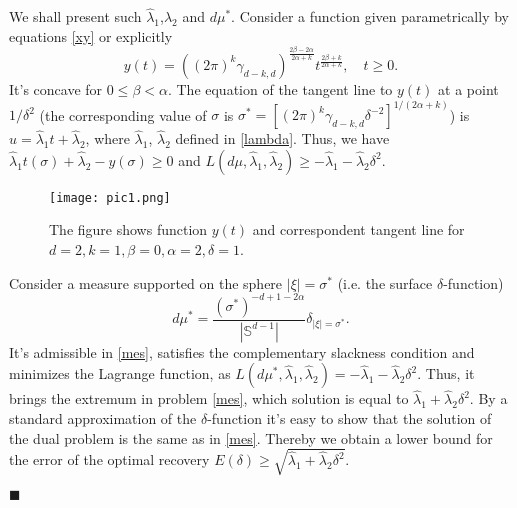 \documentclass[12pt]{iopart}
\newenvironment{proof}
{\par\noindent{\bf Proof}}
{\hfill$\scriptstyle\blacksquare$}
\begin{document}
\begin{proof}
We shall present such $\widehat\lambda_1$,$\widehat\lambda_2$ and $d\mu^*$.
Consider a function given parametrically by equations \eqref{xy} or explicitly
     \[
    y(t)=((2\pi)^k\gamma_{d-k,d})^{\frac{2\beta-2\alpha}{2\alpha+k}}t^{\frac{2\beta+k}{2\alpha+k}},\quad t\geqslant 0.
    \]
It's concave for $0\leqslant\beta<\alpha$. The equation of the tangent line to $y(t)$ at a point $1/\delta^2$ (the corresponding value of $\sigma$ is $\sigma^*=[(2\pi)^k\gamma_{d-k,d}\delta^{-2}]^{1/(2\alpha+k)}$)
is $u=\widehat\lambda_1t+\widehat\lambda_2$, where
$\widehat\lambda_1$, $\widehat\lambda_2$ defined in
\eqref{lambda}. Thus, we have
$\widehat\lambda_1t(\sigma)+\widehat\lambda_2-y(\sigma)\geqslant 0$ and
$L(d\mu,\widehat\lambda_1,\widehat\lambda_2)\geqslant
-\widehat\lambda_1-\widehat\lambda_2\delta^2.$
    \begin{figure}[h]
    \centering
    \texttt{[image: pic1.png]}
    \caption{The figure shows function $y(t)$ and correspondent tangent line for $d=2, k=1, \beta=0, \alpha=2, \delta=1$.}
    \label{pic1}
    \end{figure}
Consider a measure supported on the sphere $|\xi|=\sigma^* $ (i.e. the surface $\delta$-function) 
  $$
  d\mu^*=\frac{(\sigma^*)^{-d+1-2\alpha}}{|\mathbb S^{d-1}|}\delta_{|\xi|=\sigma^*}.
    $$ 
It's admissible in \eqref{mes}, satisfies the complementary slackness condition and minimizes the Lagrange function, as $L(d\mu^*,\widehat\lambda_1,\widehat\lambda_2)=-\widehat\lambda_1-\widehat\lambda_2\delta^2$. Thus, it brings the extremum in problem \eqref{mes}, which solution is equal to $\widehat\lambda_1+\widehat\lambda_2\delta^2$.
By a standard approximation of the $\delta$-function it's easy to show that the solution of the dual problem is the same as in \eqref{mes}. Thereby we obtain a lower bound for the error of the optimal recovery $E(\delta)\geqslant\sqrt{\widehat\lambda_1+\widehat\lambda_2\delta^2}$.


\end{proof}
\end{document}

